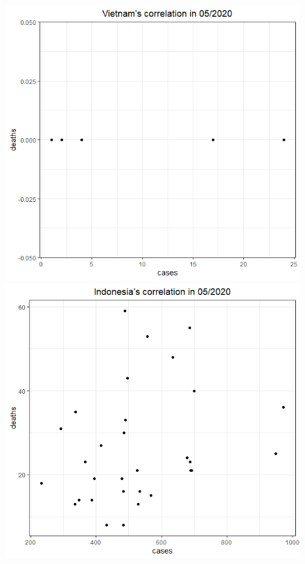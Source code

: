 \documentclass[english,10pt,table]{beamer}
\begin{document}
{\begin{figure}[H]
\begin{center}
        \includegraphics[scale = 0.2]{ix/ix.2/VN_05_2020.png}
        \includegraphics[scale = 0.2]{ix/ix.2/IDN_05_2020.png}

\end{center}
\end{figure}}
\end{document}
